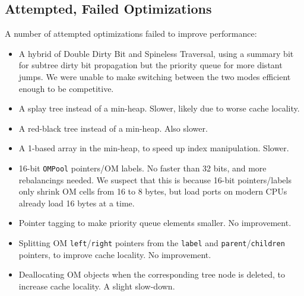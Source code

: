 \subsection{Attempted, Failed Optimizations}

A number of attempted optimizations
  failed to improve performance:
\begin{itemize}
\item A hybrid of Double Dirty Bit and Spineless Traversal,
    using a summary bit for subtree dirty bit propagation
    but the priority queue for more distant jumps.
  We were unable to make switching between the two modes
    efficient enough to be competitive.
\item A splay tree instead of a min-heap.
  Slower, likely due to worse cache locality.
\item A red-black tree instead of a min-heap. Also slower.
\item A 1-based array in the min-heap, to speed up index manipulation.
  Slower.
\item 16-bit \texttt{OMPool} pointers/OM labels.
  No faster than 32 bits, and more rebalancings needed.
  We suspect that this is because 16-bit pointers/labels
  only shrink OM cells from 16 to 8 bytes,
  but load ports on modern CPUs already load 16 bytes at a time.
\item Pointer tagging to make priority queue elements smaller.
  No improvement.
\item Splitting OM \texttt{left}/\texttt{right} pointers
  from the \texttt{label} and \texttt{parent}/\texttt{children} pointers, to improve cache locality. No improvement.
\item Deallocating OM objects when the corresponding tree node is deleted, to increase cache locality. A slight slow-down.
\end{itemize}